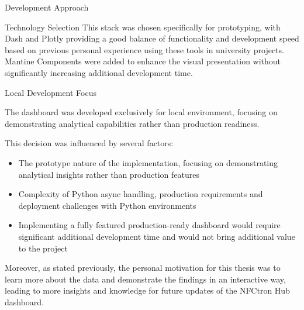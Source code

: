 \begin{section}{Development Approach}
\begin{subsection}{Technology Selection}
		This stack was chosen specifically for prototyping, with Dash and Plotly providing a good balance of functionality and development speed based on previous personal experience using these tools in university projects.
		Mantine Components were added to enhance the visual presentation without significantly increasing additional development time.
	\end{subsection}

	\begin{subsection}{Local Development Focus}
		\label{subsec:implementation-development-approach-local}

		The dashboard was developed exclusively for local environment, focusing on demonstrating analytical capabilities rather than production readiness.

		This decision was influenced by several factors:
		\begin{itemize}
			\item The prototype nature of the implementation, focusing on demonstrating analytical insights rather than production features
			\item Complexity of Python async handling, production requirements and deployment challenges with Python environments
			\item Implementing a fully featured production-ready dashboard would require significant additional development time and would not bring additional value to the project
		\end{itemize}

		Moreover, as stated previously, the personal motivation for this thesis was to learn more about the data and demonstrate the findings in an interactive way, leading to more insights and knowledge for future updates of the NFCtron Hub dashboard.

	\end{subsection}
\end{section}

